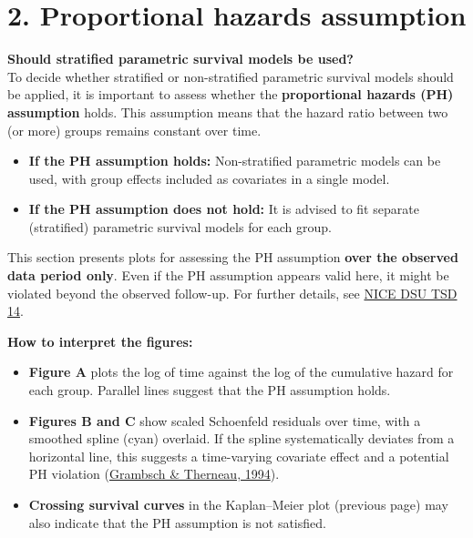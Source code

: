 \documentclass[
]{article}
\providecommand{\tightlist}{%
  \setlength{\itemsep}{0pt}\setlength{\parskip}{0pt}}
\begin{document}
\clearpage

\section{2. Proportional hazards
assumption}\label{proportional-hazards-assumption}

\textbf{Should stratified parametric survival models be used?}\\
To decide whether stratified or non-stratified parametric survival
models should be applied, it is important to assess whether the
\textbf{proportional hazards (PH) assumption} holds. This assumption
means that the hazard ratio between two (or more) groups remains
constant over time.

\begin{itemize}
\tightlist
\item
  \textbf{If the PH assumption holds:} Non-stratified parametric models
  can be used, with group effects included as covariates in a single
  model.\\
\item
  \textbf{If the PH assumption does not hold:} It is advised to fit
  separate (stratified) parametric survival models for each group.
\end{itemize}

This section presents plots for assessing the PH assumption \textbf{over
the observed data period only}. Even if the PH assumption appears valid
here, it might be violated beyond the observed follow-up. For further
details, see
\href{http://nicedsu.org.uk/wp-content/uploads/2016/03/NICE-DSU-TSD-Survival-analysis.updated-March-2013.v2.pdf}{NICE
DSU TSD 14}.

\textbf{How to interpret the figures:}

\begin{itemize}
\tightlist
\item
  \textbf{Figure A} plots the log of time against the log of the
  cumulative hazard for each group. Parallel lines suggest that the PH
  assumption holds.\\
\item
  \textbf{Figures B and C} show scaled Schoenfeld residuals over time,
  with a smoothed spline (cyan) overlaid. If the spline systematically
  deviates from a horizontal line, this suggests a time-varying
  covariate effect and a potential PH violation
  (\href{https://doi.org/10.1093/biomet/81.3.515}{Grambsch \& Therneau,
  1994}).\\
\item
  \textbf{Crossing survival curves} in the Kaplan--Meier plot (previous
  page) may also indicate that the PH assumption is not satisfied.
\end{itemize}
\end{document}
